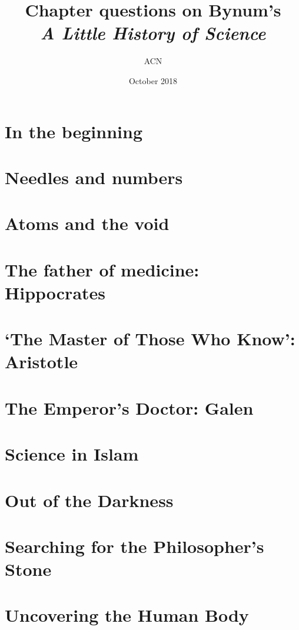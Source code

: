 \documentclass[a4paper,12pt]{article}
\title{Chapter questions on Bynum's\\ \emph{A Little History of Science}}
\author{ACN}
\date{October 2018}
\begin{document}
\maketitle

\section{In the beginning} %

\section{Needles and numbers} %

\section{Atoms and the void} %

\section{The father of medicine: Hippocrates} %

\section{`The Master of Those Who Know': Aristotle} %

\section{The Emperor's Doctor: Galen} %

\section{Science in Islam} %
	
\section{Out of the Darkness} %

\section{Searching for the Philosopher's Stone} %

\section{Uncovering the Human Body} %
\end{document}
